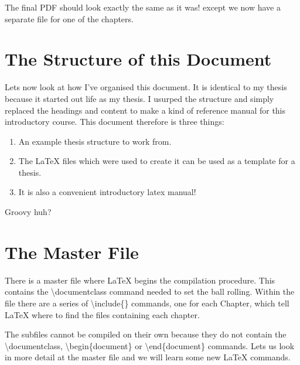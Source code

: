 The final PDF should look exactly the same as it was! except we now have a separate file for one of the chapters.

\pagebreak
\section{The Structure of this Document}

Lets now look at how I've organised this document. It is identical to my thesis because it started out life as my thesis. I usurped the structure and simply replaced the headings and content to make a kind of reference manual for this introductory course. This document therefore is three things:

\begin{enumerate}
\item An example thesis structure to work from.
\item The LaTeX files which were used to create it can be used as a template for a thesis.
\item It is also a convenient introductory latex manual!
\end{enumerate}

\vspace*{2ex}
Groovy huh?

\section{The Master File}

There is a master file where LaTeX begins the compilation procedure. This contains the {\textbackslash}documentclass command needed to set the ball rolling. Within the file there are a series of {\textbackslash}include\{\} commands, one for each Chapter, which tell LaTeX where to find the files containing each chapter.

The subfiles cannot be compiled on their own because they do not contain the {\textbackslash}documentclass, {\textbackslash}begin\{document\} or {\textbackslash}end\{document\} commands. Lets us look in more detail at the master file and we will learn some new LaTeX commands.

